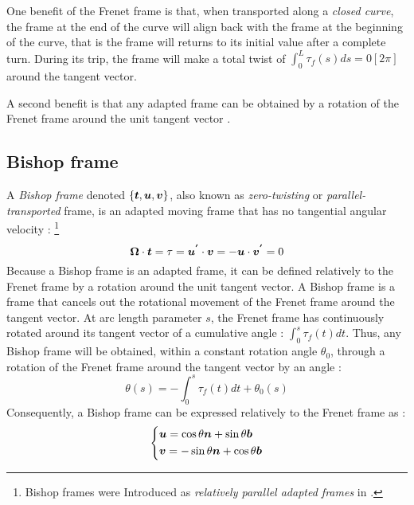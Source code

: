 One benefit of the Frenet frame is that, when transported along a \emph{closed curve}, the frame at the end of the curve will align back with the frame at the beginning of the curve, that is the frame will returns to its initial value after a complete turn. During its trip, the frame will make a total twist of $\int_0^L \tau_f(s)ds = 0[2\pi]$ around the tangent vector.

A second benefit is that any adapted frame can be obtained by a rotation of the Frenet frame around the unit tangent vector \cite[p.2]{Guggenheimer1989}.

\subsection{Bishop frame}\label{sec:bishop}

A \emph{Bishop frame} denoted $\{\boldsymbol{t},\boldsymbol{u},\boldsymbol{v}\}$, also known as \emph{zero-twisting} or \emph{parallel-transported} frame, is an adapted moving frame that has no tangential angular velocity : \footnote{Bishop frames were Introduced as \emph{relatively parallel adapted frames} in \cite{Bishop1975}.}
\begin{equation}
	\boldsymbol{\Omega} \cdot \boldsymbol{t} = \tau =\boldsymbol{u^{'}} \cdot \boldsymbol{v} = - \boldsymbol{u} \cdot \boldsymbol{v^{'}} = 0
\end{equation}
Because a Bishop frame is an adapted frame, it can be defined relatively to the Frenet frame by a rotation around the unit tangent vector. A Bishop frame is a frame that cancels out the rotational movement of the Frenet frame around the tangent vector. At arc length parameter $s$, the Frenet frame has continuously rotated around its tangent vector of a cumulative angle : $\int_0^s \tau_f(t)dt$. Thus, any Bishop frame will be obtained, within a constant rotation angle $\theta_0$, through a rotation of the Frenet frame around the tangent vector by an angle :
\begin{equation}
	\theta(s)  =  - \int_0^s \tau_f(t)dt + \theta_0(s)
\end{equation}
Consequently, a Bishop frame can be expressed relatively to the Frenet frame as :
\begin{equation}
	\left\{
	\begin{aligned}
		&\boldsymbol{u} = \cos \theta \boldsymbol{n} +  \sin \theta \boldsymbol{b}\\
		&\boldsymbol{v} = -\sin \theta \boldsymbol{n} +  \cos \theta \boldsymbol{b}
	\end{aligned}
	\right.
\end{equation}
